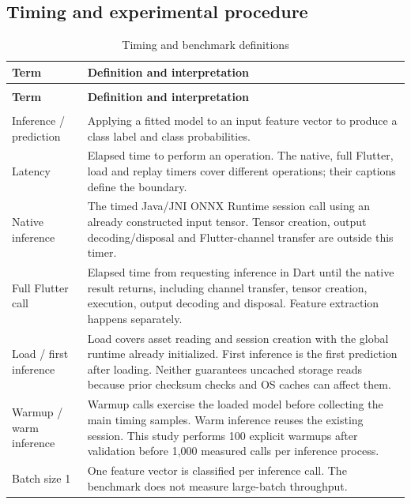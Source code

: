 \documentclass[10pt,a4paper]{article}
\begin{document}
\subsection{Timing and experimental procedure}
\begingroup\small\setlength{\tabcolsep}{4pt}\renewcommand{\arraystretch}{1.12}
\begin{longtable}{@{}>{\raggedright\arraybackslash}p{}>{\raggedright\arraybackslash}p{}@{}}
\caption{Timing and benchmark definitions}\\
\toprule
\textbf{Term} & \textbf{Definition and interpretation} \\
\midrule\endfirsthead
\multicolumn{2}{l}{\small\itshape Continued from previous page}\\
\toprule
\textbf{Term} & \textbf{Definition and interpretation} \\
\midrule\endhead
\midrule\multicolumn{2}{r}{\small Continued on next page}\\\endfoot
\bottomrule\endlastfoot
Inference /\allowbreak{} prediction & Applying a fitted model to an input feature vector to produce a class label and class probabilities. \\
Latency & Elapsed time to perform an operation. The native, full Flutter, load and replay timers cover different operations; their captions define the boundary. \\
Native inference & The timed Java/\allowbreak{}JNI ONNX Runtime session call using an already constructed input tensor. Tensor creation, output decoding/\allowbreak{}disposal and Flutter-channel transfer are outside this timer. \\
Full Flutter call & Elapsed time from requesting inference in Dart until the native result returns, including channel transfer, tensor creation, execution, output decoding and disposal. Feature extraction happens separately. \\
Load /\allowbreak{} first inference & Load covers asset reading and session creation with the global runtime already initialized. First inference is the first prediction after loading. Neither guarantees uncached storage reads because prior checksum checks and OS caches can affect them. \\
Warmup /\allowbreak{} warm inference & Warmup calls exercise the loaded model before collecting the main timing samples. Warm inference reuses the existing session. This study performs 100 explicit warmups after validation before 1,000 measured calls per inference process. \\
Batch size 1 & One feature vector is classified per inference call. The benchmark does not measure large-batch throughput. \\

\end{longtable}
\end{document}
